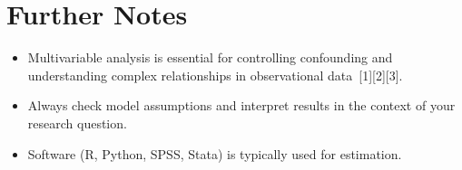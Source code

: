 \documentclass[11pt]{article}
\begin{document}
\section{Further Notes}

\begin{itemize}
    \item Multivariable analysis is essential for controlling confounding and understanding complex relationships in observational data\ [1][2][3].
    \item Always check model assumptions and interpret results in the context of your research question.
    \item Software (R, Python, SPSS, Stata) is typically used for estimation.
\end{itemize}
\end{document}
